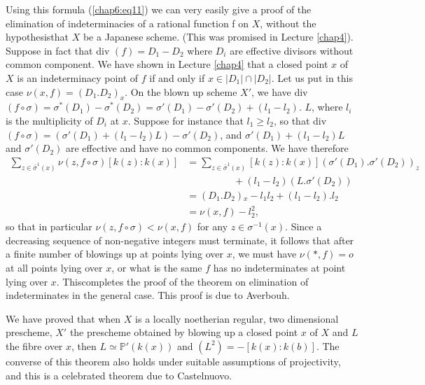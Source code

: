 Using this formula (\ref{chap6:eq11}) we can very easily give a proof of the
elimination of indeterminacies of a rational function f on $X$,
without the hypothesis\pageoriginale that $X$ be a Japanese
scheme. (This was promised in 
Lecture \ref{chap4}). Suppose in fact that div $(f) = D_1-D_2$ where $D_i$ are
effective divisors without common component. We have shown in Lecture
\ref{chap4} that a closed point $x$ of $X$ is an indeterminacy point of $f$ if
and only if $x \in |D_1|\cap|D_2|$. Let us put in this case $\nu
(x,f)= (D_1.D_2)_x$. 
On the blown up scheme $X'$, we have div $(f \circ \sigma)=
\sigma^*(D_1)-\sigma^*(D_2)=\sigma'(D_1)-\sigma'(D_2)+(l_1-l_2)$. $L$,
where $l_i$ is the multiplicity of $D_i$ at $x$. Suppose for instance
that $l_1 \geq l_2$, so that div $(f \circ
\sigma)=(\sigma'(D_1)+(l_1-l_2)L)-\sigma'(D_2)$, and $\sigma'
(D_1)+(l_1-l_2)L$ and $\sigma' (D_2)$ are effective and have no common
components. We have therefore 
\begin{align*}
  \sum_{z \in \bar{\sigma}^1 (x)} \nu (z,f \circ \sigma)[k(z): k(x)]& =
  \sum_{z \in \bar{\sigma}^1(x)} [k(z):k(x)](\sigma'(D_1). \sigma'(D_2))_z\\ 
  & \hspace{2cm}+(l_1 -l_2)(L. \sigma'(D_2))\\
  & =(D_1.D_2){_x}- l_1l_2 + (l_1-l_2).l_2\\
  & = \nu (x, f)-l^2_2,
\end{align*}
so that in particular $\nu (z, f \circ \sigma)< \nu (x,f)$ for any $z
\in \sigma^{-1}(x)$. Since a decreasing sequence of non-negative
integers must terminate, it follows that after a finite number of
blowings up at points lying over $x$, we must have $\nu (*,f)=o$ at
all points lying over $x$, or what is the same $f$ has no
indeterminates at point lying over $x$. This\pageoriginale completes
the proof of the theorem on elimination of indeterminates in the
general case. This proof is due to Averbouh.  

We have proved that when $X$ is a locally noetherian regular, two
dimensional prescheme, $X'$ the prescheme obtained by blowing up a
closed point $x$ of $X$ and $L$ the fibre over $x$, then $L \simeq
\mathbb{P'}(k(x))$ and $(L^2)=-[k(x):k(b)]$. The converse of this
theorem also holds under suitable assumptions of projectivity, and
this is a celebrated theorem due to Castelnuovo. 

